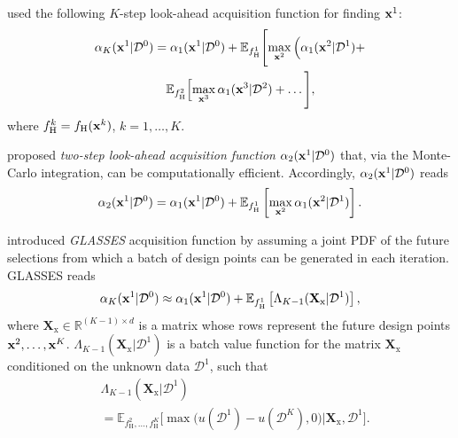 \documentclass[iicol,sn-basic]{sn-jnl}%
\begin{document}
\cite{Jiang2020} used the following $K$-step look-ahead acquisition function for finding ${\bf x}^1$:
\begin{equation}\label{eqn52}
	\begin{aligned}
		\alpha_K({\bf x}^1|\mathcal{D}^0) &  = \alpha_1({\bf x}^1|\mathcal{D}^0) +\mathbb{E}_{f_\text{H}^1}\Bigg[\underset{{\bf x}^2}{\max}\,\Big(\alpha_1({{\bf x}}^2|\mathcal{D}^1) + \\
		& \quad \mathbb{E}_{f_\text{H}^2}\Big[\underset{{\bf x}^3}{\max}\,\alpha_1({\bf x}^3|\mathcal{D}^2)+\dots  \Bigg],
	\end{aligned}
\end{equation}
where $f^k_\text{H} = f_\text{H}({\bf x}^k)$, $k=1,\dots,K$.

\cite{WuJ2019} proposed \textit{two-step look-ahead acquisition function} $\alpha_2({\bf x}^1|\mathcal{D}^0)$ that, via the Monte-Carlo integration, can be computationally efficient.
Accordingly, $\alpha_2({\bf x}^1|\mathcal{D}^0)$ reads
\begin{equation}\label{eqn53}
		\alpha_2({\bf x}^1|\mathcal{D}^0) =\alpha_1({\bf x}^1|\mathcal{D}^0) + \mathbb{E}_{f^1_\text{H}}\left[\underset{{\bf x}^2}{\max}\,\alpha_1({\bf x}^2|\mathcal{D}^1)\right].
\end{equation}

\cite{Gonzalez2016} introduced \textit{GLASSES} acquisition function by assuming a joint PDF of the future selections from which a batch of design points can be generated in each iteration.
GLASSES reads
\begin{equation}\label{eqn54}
		\alpha_K({\bf x}^1|\mathcal{D}^0) \approx \alpha_1({\bf x}^1|\mathcal{D}^0) + \mathbb{E}_{f^1_\text{H}}\left[\Lambda_{K-1}(\textbf{X}_\text{x}|\mathcal{D}^1)\right],
\end{equation}
where 
$\textbf{X}_\text{x} \in \mathbb{R}^{(K-1) \times d}$ is a matrix whose rows represent the future design points ${\bf x}^2,\dots,{\bf x}^K$. $\Lambda_{K-1}(\textbf{X}_\text{x}|\mathcal{D}^1)$ is a batch value function for the matrix  $\textbf{X}_\text{x}$ conditioned on the unknown data $\mathcal{D}^1$, such that 
\begin{equation}\label{eqn55}
	\begin{aligned}
	& \Lambda_{K-1}(\textbf{X}_\text{x}|\mathcal{D}^1)\\
	& =\mathbb{E}_{f_\text{H}^2,\dots,f_\text{H}^K}\Bigg[\max\Big(u(\mathcal{D}^1)-u(\mathcal{D}^K),0  \Big)|\textbf{X}_\text{x},\mathcal{D}^1\Bigg].
	\end{aligned}
\end{equation}
\end{document}
